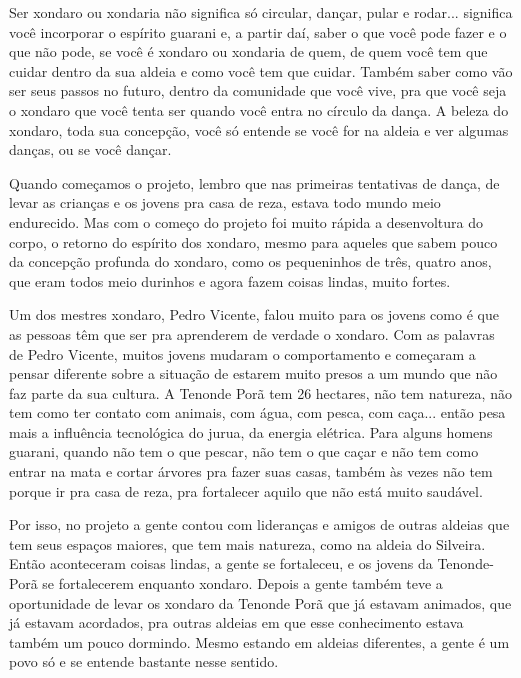 \documentclass{article}
\begin{document}
Ser xondaro ou xondaria n\~ao significa s\'o circular, dan\c{c}ar, pular
e rodar... significa voc\^e incorporar o esp\'irito guarani e, a partir
da\'i, saber o que voc\^e pode fazer e o que n\~ao pode, se voc\^e \'e
xondaro ou xondaria de quem, de quem voc\^e tem que cuidar dentro da
sua aldeia e como voc\^e tem que cuidar. Tamb\'em saber como v\~ao ser
seus passos no futuro, dentro da comunidade que voc\^e vive, pra que
voc\^e seja o xondaro que voc\^e tenta ser quando voc\^e entra no
c\'irculo da dan\c{c}a. A beleza do xondaro, toda sua concep\c{c}\~ao,
voc\^e s\'o entende se voc\^e for na aldeia e ver algumas dan\c{c}as,
ou se voc\^e dan\c{c}ar.

Quando come\c{c}amos o projeto, lembro que nas primeiras tentativas de
dan\c{c}a, de levar as crian\c{c}as e os jovens pra casa de reza,
estava todo mundo meio endurecido. Mas com o come\c{c}o do projeto foi
muito r\'apida a desenvoltura do corpo, o retorno do esp\'irito dos
xondaro, mesmo para aqueles que sabem pouco da concep\c{c}\~ao profunda
do xondaro, como os pequeninhos de tr\^es, quatro anos, que eram todos
meio durinhos e agora fazem coisas lindas, muito fortes. 

Um dos mestres xondaro, Pedro Vicente, falou muito para os jovens como
\'e que as pessoas t\^em que ser pra aprenderem de verdade o xondaro.
Com as palavras de Pedro Vicente, muitos jovens mudaram o comportamento
e come\c{c}aram a pensar diferente sobre a situa\c{c}\~ao de estarem
muito presos a um mundo que n\~ao faz parte da sua cultura. A Tenonde
Por\~a tem 26 hectares, n\~ao tem natureza, n\~ao tem como ter contato
com animais, com \'agua, com pesca, com ca\c{c}a... ent\~ao pesa mais a
influ\^encia tecnol\'ogica do jurua, da energia el\'etrica. Para alguns
homens guarani, quando n\~ao tem o que pescar, n\~ao tem o que
ca\c{c}ar e n\~ao tem como entrar na mata e cortar \'arvores pra fazer
suas casas, tamb\'em \`as vezes n\~ao tem porque ir pra casa de reza,
pra fortalecer aquilo que n\~ao est\'a muito saud\'avel.

Por isso, no projeto a gente contou com lideran\c{c}as e amigos de
outras aldeias que tem seus espa\c{c}os maiores, que tem mais natureza,
como na aldeia do Silveira. Ent\~ao aconteceram coisas lindas, a gente
se fortaleceu, e os jovens da Tenonde-Por\~a se fortalecerem enquanto
xondaro. Depois a gente tamb\'em teve a oportunidade de levar os
xondaro da Tenonde Por\~a que j\'a estavam animados, que j\'a estavam
acordados, pra outras aldeias em que esse conhecimento estava tamb\'em
um pouco dormindo. Mesmo estando em aldeias diferentes, a gente \'e um
povo s\'o e se entende bastante nesse sentido.
\end{document}
